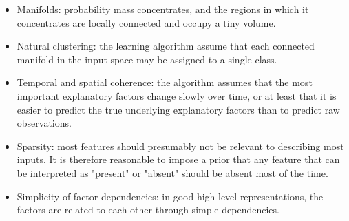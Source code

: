 \documentclass{article}
\begin{document}
\begin{itemize}
\begin{itemize}
\item Manifolds: probability mass concentrates, and the regions in which it concentrates are locally connected and occupy a tiny volume.
\item Natural clustering: the learning algorithm assume that each connected manifold in the input space may be assigned to a single class.
\item Temporal and spatial coherence: the algorithm assumes that the most important explanatory factors change slowly over time, or at least that it is easier to predict the true underlying explanatory factors than to predict raw observations.
\item Sparsity: most features should presumably not be relevant to describing most inputs. It is therefore reasonable to impose a prior that any feature that can be interpreted as "present" or "absent" should be absent most of the time.
\item Simplicity of factor dependencies: in good high-level representations, the factors are related to each other through simple dependencies.
\end{itemize}
\end{itemize}
\end{document}

